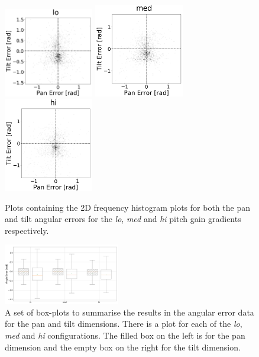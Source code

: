 \documentclass[format=sigconf, review=true, screen=true, anonymous=true]{acmart}
\begin{document}
\begin{figure}
  \centering
  \includegraphics[width=0.35\textwidth]{figures/err_lo.png}
  \includegraphics[width=0.35\textwidth]{figures/err_med.png}
  \includegraphics[width=0.35\textwidth]{figures/err_hi.png}
  \caption{Plots containing the 2D frequency histogram plots for both the pan and tilt angular errors for the \emph{lo}, \emph{med} and \emph{hi} pitch gain gradients respectively. }
  \label{fig:err-results}
\end{figure}

\begin{figure}
  \centering
  \includegraphics[width=0.45\textwidth]{figures/err_boxplot.png}
  \caption{A set of box-plots to summarise the results in the angular error data for the pan and tilt dimensions. There is a plot for each of the \emph{lo}, \emph{med} and \emph{hi} configurations. The filled box on the left is for the pan dimension and the empty box on the right for the tilt dimension. }
  \label{fig:err-boxplots}
\end{figure}
\end{document}
